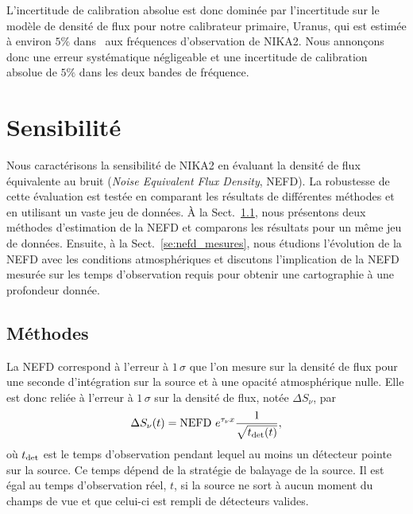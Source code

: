 L'incertitude de calibration absolue est donc dominée par
l'incertitude sur le modèle de densité de flux pour notre calibrateur
primaire, Uranus, qui est estimée à environ $5\%$
dans~\citet{Bendo2013} aux fréquences d'observation de NIKA2. Nous
annonçons donc une erreur systématique négligeable et une incertitude
de calibration absolue de $5\%$ dans les deux bandes de fréquence.





%
%
%
%
%
%
%
%
%
%
\section{Sensibilité}
\label{se:sensibilite}


Nous caractérisons la sensibilité de NIKA2 en évaluant la densité de
flux équivalente au bruit (\emph{Noise Equivalent Flux Density},
NEFD). La robustesse de cette évaluation est testée en comparant les
résultats de différentes méthodes et en utilisant un vaste jeu de
données. \`A la Sect.~\ref{se:nefd_methodes}, nous présentons deux
méthodes d'estimation de la NEFD et comparons les résultats pour un
même jeu de données. Ensuite, à la Sect.~\ref{se:nefd_mesures}, nous
étudions l'évolution de la NEFD avec les conditions atmosphériques et
discutons l'implication de la NEFD mesurée sur les temps d'observation
requis pour obtenir une cartographie à une profondeur donnée. 


\subsection{Méthodes}
\label{se:nefd_methodes}

La NEFD correspond à l'erreur à $1\,\sigma$ que l'on mesure sur la
densité de flux pour une seconde d'intégration sur la source et à une
opacité atmosphérique nulle. Elle est donc reliée à l'erreur à
$1\,\sigma$ sur la densité de flux, notée $\Delta S_\nu$,  par
\begin{equation}
  \Delta S_\nu (t) = {\rm{NEFD}} \,\, e^{ \tau_{\nu} x}
  \frac{1}{\sqrt{t_{\rm{det}}(t)}},
  \label{eq:relation_sigma_nefd}
\end{equation}
où $t_{\rm{det}}$ est le temps d'observation pendant lequel au moins un
détecteur pointe sur la source. Ce temps dépend de la stratégie de
balayage de la source. Il est égal au temps d'observation réel, $t$,
si la source ne sort à aucun moment du champs de vue et que celui-ci
est rempli de détecteurs valides.

